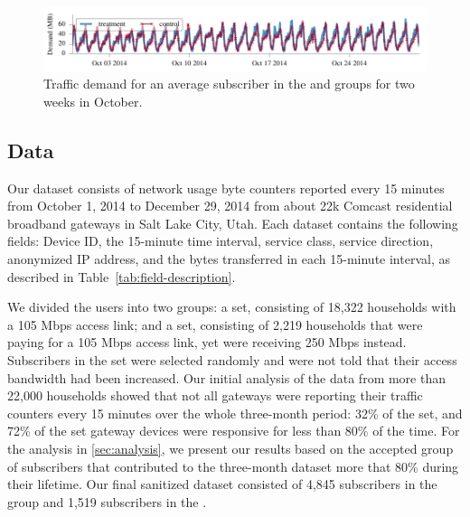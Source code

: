 \begin{figure}[t]
\centering
\includegraphics[width=\linewidth]{figures/traffic_demand_Oct.pdf}
  \caption{Traffic demand for an average subscriber in the \control{} and 
\treatment{} groups for two weeks in October.\label{fig:traffic-load}}
\end{figure}


\subsection{Data}

Our dataset consists of network usage byte counters reported every 15
minutes from October 1, 2014 to December 29, 2014 from about 22k
Comcast residential broadband gateways in Salt Lake City, Utah. Each
dataset contains the following fields: Device ID, the 15-minute time interval,
service class, service direction, anonymized IP address, and the bytes
transferred in each 15-minute interval, as described in
Table~\ref{tab:field-description}.

We divided the users into two groups: a \control{} set, consisting of
18,322 households with a 105 Mbps access link; and a \treatment{} set,
consisting of 2,219 households that were paying for a 105 Mbps access
link, yet were receiving 250 Mbps instead.  Subscribers in the
\treatment{} set were selected randomly and were not told that their
access bandwidth had been increased.  Our initial analysis of the data
from more than 22,000 households showed that not all gateways were
reporting their traffic counters every 15 minutes over the whole three-month
period: 32\% of the \treatment{} set, and 72\% of the \control{} set
gateway devices were responsive for less than 80\% of the time. For the
analysis in \autoref{sec:analysis}, we present our results based on the
accepted group of subscribers that contributed to the three-month dataset
more that 80\% during their lifetime. Our final sanitized dataset consisted of
4,845 subscribers in the \control{} group and 1,519 subscribers in the
\treatment{}.


